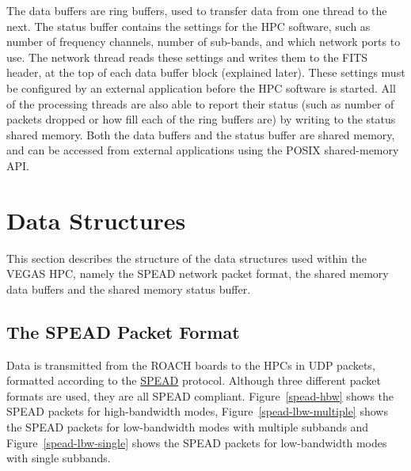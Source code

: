 \documentclass[11pt]{article} %
\begin{document}
The data buffers are ring buffers, used to transfer data from one thread to the next. The status buffer contains the settings for the HPC software, such as number of frequency channels, number of sub-bands, and which network ports to use. The network thread reads these settings and writes them to the FITS header, at the top of each data buffer block (explained later). These settings must be configured by an external application before the HPC software is started. All of the processing threads are also able to report their status (such as number of packets dropped or how fill each of the ring buffers are) by writing to the status shared memory. Both the data buffers and the status buffer are shared memory, and can be accessed from external applications using the POSIX shared-memory API.



\clearpage
\section{Data Structures}

This section describes the structure of the data structures used within the VEGAS HPC, namely the SPEAD network packet format, the shared memory data buffers and the shared memory status buffer.

\subsection{The SPEAD Packet Format}
\label{spead-section}

Data is transmitted from the ROACH boards to the HPCs in UDP packets, formatted according to the \href{https://casper.berkeley.edu/wiki/SPEAD}{SPEAD} protocol. Although three different packet formats are used, they are all SPEAD compliant. Figure~\ref{spead-hbw} shows the SPEAD packets for high-bandwidth modes, Figure~\ref{spead-lbw-multiple} shows the SPEAD packets for low-bandwidth modes with multiple subbands and Figure~\ref{spead-lbw-single} shows the SPEAD packets for low-bandwidth modes with single subbands.
\end{document}
